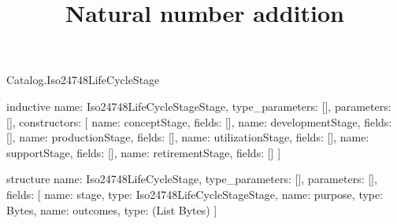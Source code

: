 \begin{lexlean}{Catalog.Iso24748LifeCycleStage}
\title{Natural number addition}
\begin{semanticmodule}
inductive{
  name: Iso24748LifeCycleStageStage,
  type_parameters: [],
  parameters: [],
  constructors: [
    {name: conceptStage, fields: []},
    {name: developmentStage, fields: []},
    {name: productionStage, fields: []},
    {name: utilizationStage, fields: []},
    {name: supportStage, fields: []},
    {name: retirementStage, fields: []}
  ]
}

structure{
  name: Iso24748LifeCycleStage,
  type_parameters: [],
  parameters: [],
  fields: [
    {name: stage, type: Iso24748LifeCycleStageStage},
    {name: purpose, type: Bytes},
    {name: outcomes, type: (List Bytes)}
  ]
}
\end{semanticmodule}
\end{lexlean}
